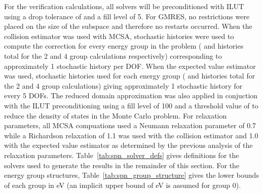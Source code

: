 For the verification calculations, all solvers will be preconditioned
with ILUT using a drop tolerance of  and a fill level of
5. For GMRES, no restrictions were placed on the size of the subspace
and therefore no restarts occurred. When the collision estimator was
used with MCSA,  stochastic histories were used to compute
the correction for every energy group in the problem ( and
 histories total for the 2 and 4 group calculations
respectively) corresponding to approximately 1 stochastic history per
DOF. When the expected value estimator was used,  stochastic
histories used for each energy group ( and 
histories total for the 2 and 4 group calculations) giving
approximately 1 stochastic history for every 5 DOFs. The reduced
domain approximation was also applied in conjuction with the ILUT
preconditioning using a fill level of 100 and a threshold value of
 to reduce the density of states in the Monte Carlo
problem. For relaxation parameters, all MCSA compuations used a
Neumann relaxation parameter of 0.7 while a Richardson relaxation of
1.1 was used with the collision estimator and 1.0 with the expected
value estimator as determined by the previous analysis of the
relaxation parameters. Table~\ref{tab:spn_solver_defs} gives
definitions for the solvers used to generate the results in the
remainder of this section. For the energy group structures,
Table~\ref{tab:spn_group_structure} gives the lower bounds of each
group in eV (an implicit upper bound of  eV is assumed for
group 0).
